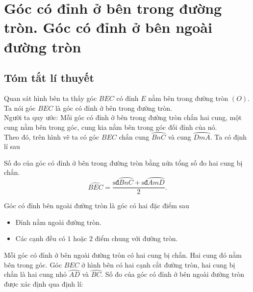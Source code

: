 \section{Góc có đỉnh ở bên trong đường tròn. Góc có đỉnh ở bên ngoài đường tròn}
\subsection{Tóm tắt lí thuyết}
\immini
{Quan sát hình bên ta thấy góc $ BEC $ có đỉnh $ E $ nằm bên trong đường tròn $ (O) $. Ta nói góc $ BEC $ là góc có đỉnh ở bên trong đường tròn.\\
Người ta quy ước: Mỗi góc có đỉnh ở bên trong đường tròn chắn hai cung, một cung nằm bên trong góc, cung kia nằm bên trong góc đối đỉnh của nó.\\
Theo đó, trên hình vẽ ta có góc $ BEC $ chắn cung $\wideparen{BnC} $ và cung $ \wideparen{DmA} $. Ta có định lí sau}{}
\begin{dl}
Số đo của góc có đỉnh ở bên trong đường tròn bằng nửa tổng số đo hai cung bị chắn.
$$\widehat{BEC}=\dfrac{\text{sđ}\wideparen{BnC}+\text{sđ}\wideparen{AmD}}{2}.$$
\end{dl}
\immini
{
Góc có đỉnh bên ngoài đường tròn là góc có hai đặc điểm sau
\begin{itemize}
	\item Đỉnh nằm ngoài đường tròn.
	\item Các cạnh đều có $ 1 $ hoặc $ 2 $ điểm chung với đường tròn.
\end{itemize}
Mỗi góc có đỉnh ở bên ngoài đường tròn có hai cung bị chắn. Hai cung đó nằm bên trong góc.
Góc $ BEC $ ở hình bên có hai cạnh cắt đường tròn, hai cung bị chắn là hai cung nhỏ $ \wideparen{AD} $ và $ \wideparen{BC} $.
Số đo của góc có đỉnh ở bên ngoài đường tròn được xác định qua định lí:	
}
